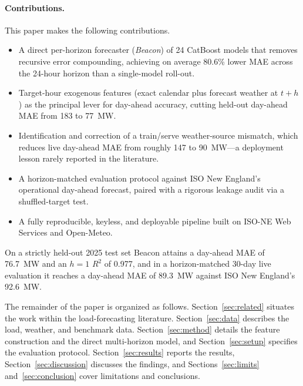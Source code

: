 \paragraph{Contributions.} This paper makes the following contributions.
\begin{itemize}
  \item A direct per-horizon forecaster (\emph{Beacon}) of 24 CatBoost models
        that removes recursive error compounding, achieving on average 80.6\%
        lower MAE across the 24-hour horizon than a single-model roll-out.
  \item Target-hour exogenous features (exact calendar plus forecast weather at
        $t{+}h$) as the principal lever for day-ahead accuracy, cutting
        held-out day-ahead MAE from 183 to 77~MW.
  \item Identification and correction of a train/serve weather-source mismatch,
        which reduces live day-ahead MAE from roughly 147 to 90~MW---a
        deployment lesson rarely reported in the literature.
  \item A horizon-matched evaluation protocol against ISO New England's
        operational day-ahead forecast, paired with a rigorous leakage audit via
        a shuffled-target test.
  \item A fully reproducible, keyless, and deployable pipeline built on ISO-NE
        Web Services and Open-Meteo.
\end{itemize}

On a strictly held-out 2025 test set Beacon attains a day-ahead MAE of 76.7~MW
and an $h{=}1$ $R^2$ of 0.977, and in a horizon-matched 30-day live evaluation
it reaches a day-ahead MAE of 89.3~MW against ISO New England's 92.6~MW.

The remainder of the paper is organized as follows.
Section~\ref{sec:related} situates the work within the load-forecasting
literature. Section~\ref{sec:data} describes the load, weather, and benchmark
data. Section~\ref{sec:method} details the feature construction and the direct
multi-horizon model, and Section~\ref{sec:setup} specifies the evaluation
protocol. Section~\ref{sec:results} reports the results, Section~\ref{sec:discussion}
discusses the findings, and Sections~\ref{sec:limits} and~\ref{sec:conclusion}
cover limitations and conclusions.

